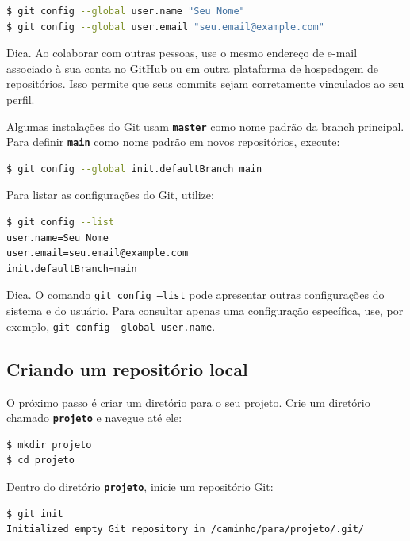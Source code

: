 \documentclass[12pt,a4paper]{article}
\begin{document}
\begin{lstlisting}[language=bash]
$ git config --global user.name "Seu Nome"
$ git config --global user.email "seu.email@example.com" 
\end{lstlisting}

\begin{question}{Dica.}
\footnotesize Ao colaborar com outras pessoas, use o mesmo endereço de e-mail associado à sua conta no GitHub ou em outra plataforma de hospedagem de repositórios. Isso permite que seus commits sejam corretamente vinculados ao seu perfil.
\end{question}

Algumas instalações do Git usam \textbf{\texttt{master}} como nome padrão da branch principal. Para definir \textbf{\texttt{main}} como nome padrão em novos repositórios, execute:

\begin{lstlisting}[language=bash]
$ git config --global init.defaultBranch main
\end{lstlisting}

Para listar as configurações do Git, utilize:

\begin{lstlisting}[language=bash]
$ git config --list
user.name=Seu Nome
user.email=seu.email@example.com
init.defaultBranch=main
\end{lstlisting}

\begin{question}{Dica.}
\footnotesize O comando \texttt{git config --list} pode apresentar outras configurações do sistema e do usuário. Para consultar apenas uma configuração específica, use, por exemplo, \texttt{git config --global user.name}.
\end{question}

\subsection{Criando um repositório local}

O próximo passo é criar um diretório para o seu projeto. Crie um diretório chamado \textbf{\texttt{projeto}} e navegue até ele:

\begin{lstlisting}[language=bash]
$ mkdir projeto
$ cd projeto
\end{lstlisting}

Dentro do diretório \textbf{\texttt{projeto}}, inicie um repositório Git:

\begin{lstlisting}[language=bash]
$ git init
Initialized empty Git repository in /caminho/para/projeto/.git/
\end{lstlisting}
\end{document}
